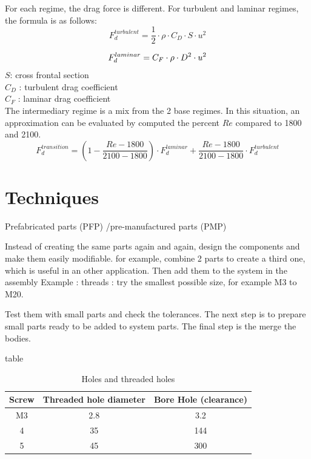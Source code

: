 \documentclass[12pt,a4paper]{article}
\begin{document}
	For each regime, the drag force is different. 
	For turbulent and laminar regimes, the formula is as follows:
	\begin{equation}
		F_d^{turbulent} = \frac{1}{2} \cdot \rho \cdot C_D \cdot S \cdot u^2
	\end{equation}
	
	\begin{equation}
		F_d^{laminar} = C_F \cdot \rho \cdot  D^2 \cdot u^2\\
	\end{equation}
	$S$: cross frontal section\\
	$C_D$ : turbulent drag coefficient\\
	$C_F$ : laminar drag coefficient\\
	
	The intermediary regime is a mix from the 2 base regimes. In this situation, an approximation can be evaluated by computed the percent $Re$ compared to 1800 and 2100. 
	\begin{equation}
		F_d^{transition} = (1- \frac{Re - 1800}{2100-1800}) \cdot F_d^{laminar} + \frac{Re - 1800}{2100-1800} \cdot F_d^{turbulent}
	\end{equation}
	
	
	\newpage
	\section{Techniques}
	Prefabricated parts (PFP) /pre-manufactured parts (PMP)
	
	Instead of creating the same parts again and again, design the components and make them easily modifiable.
	for example, combine 2 parts to create a third one, which is useful in an other application. Then add them to the system in the assembly
	Example : threads : try the smallest possible size, for example M3 to M20. 
	
	Test them with small parts and check the tolerances. 
	The next step is to prepare small parts ready to be added to system parts. The final step is the merge the bodies. 
	
	
	table
	
	\begin{table}[ht]
		\caption{Holes and threaded holes} %
		\centering %
		\begin{tabular}{c c c} %
			\hline\hline %
			Screw & Threaded hole diameter & Bore Hole (clearance) \\ [0.5ex] %
			\hline %
			M3 & 2.8 & 3.2 \\ %
			4 & 35 & 144 \\
			5 & 45 & 300 \\ [1ex] %
			\hline %
		\end{tabular}\label{table:nonlin} %
	\end{table}
	
\end{document}
